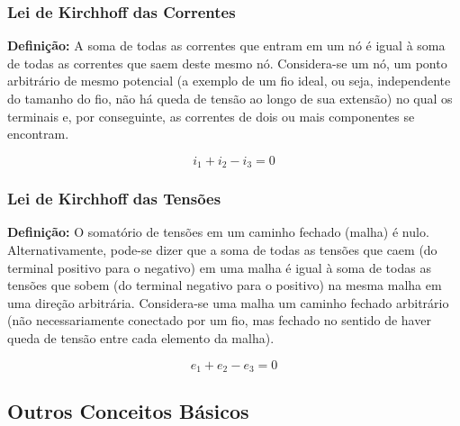 \documentclass{article}
\numberwithin{equation}{section}
\begin{document}
\subsubsection{Lei de Kirchhoff das Correntes}
\label{subsubsec:KCL}
\textbf{Definição:} A soma de todas as correntes que entram em um nó é igual à soma de todas as correntes que saem deste mesmo nó. Considera-se um nó, um ponto arbitrário de mesmo potencial (a exemplo de um fio ideal, ou seja, independente do tamanho do fio, não há queda de tensão ao longo de sua extensão) no qual os terminais e, por conseguinte, as correntes de dois ou mais componentes se encontram.
\begin{center}
    $$i_{1}+i_{2}-i_{3} = 0$$
\end{center}

\subsubsection{Lei de Kirchhoff das Tensões}
\label{subsubsec:KVL}
\textbf{Definição:} O somatório de tensões em um caminho fechado (malha) é nulo. Alternativamente, pode-se dizer que a soma de todas as tensões que caem (do terminal positivo para o negativo) em uma malha é igual à soma de todas as tensões que sobem (do terminal negativo para o positivo) na mesma malha em uma direção arbitrária. Considera-se uma malha um caminho fechado arbitrário (não necessariamente conectado por um fio, mas fechado no sentido de haver queda de tensão entre cada elemento da malha).
\begin{center}
    $$e_{1}+e_{2}-e_{3}=0$$
\end{center}

\subsection{Outros Conceitos Básicos}
\label{subsec:def}
\end{document}
